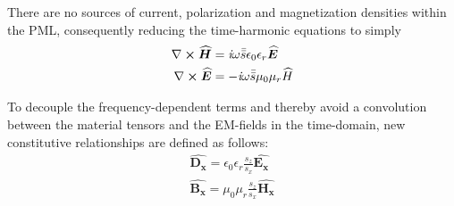 \documentclass[]{article}
\begin{document}
		There are no sources of current, polarization and magnetization densities within the PML, consequently reducing the time-harmonic equations to simply
		\begin{align}
			\nabla\cross\bm{\widehat{H}} &= \textit{i}\omega\bar{\bar{s}}\epsilon_{0}\epsilon_{r}\bm{\widehat{E}} \\
			\nabla\cross\bm{\widehat{E}} &= -\textit{i}\omega\bar{\bar{s}}\mu_{0}\mu_{r}\widehat{H}
		\end{align}
		
		To decouple the frequency-dependent terms and thereby avoid a convolution between the material tensors and the EM-fields in the time-domain, new constitutive relationships are defined as follows:
		\begin{align} \label{eq:const}
			\bm{\widehat{D_{x}}} = \epsilon_{0}\epsilon_{r}\frac{s_{z}}{s_{x}}\bm{\widehat{E_{x}}} \\
			\bm{\widehat{B_{x}}} = \mu_{0}\mu_{r}\frac{s_{z}}{s_{x}}\bm{\widehat{H_{x}}} \\
		\end{align}
		
\end{document}
